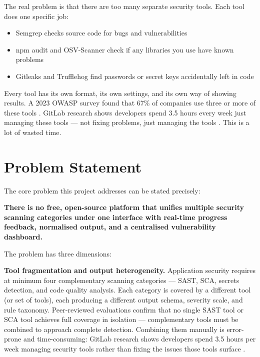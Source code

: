 \documentclass[12pt,a4paper]{report}
\begin{document}
The real problem is that there are too many separate security tools. Each tool does one specific job:
\begin{itemize}
    \item Semgrep checks source code for bugs and vulnerabilities
    \item npm audit and OSV-Scanner check if any libraries you use have known problems
    \item Gitleaks and Trufflehog find passwords or secret keys accidentally left in code
\end{itemize}

Every tool has its own format, its own settings, and its own way of showing results. A 2023 OWASP survey found that 67\% of companies use three or more of these tools \cite{owasp2023}. GitLab research shows developers spend 3.5 hours every week just managing these tools --- not fixing problems, just managing the tools \cite{gitlab2023}. This is a lot of wasted time.

\section{Problem Statement}
\label{sec:problem_statement}

The core problem this project addresses can be stated precisely:

\textbf{There is no free, open-source platform that unifies multiple security scanning categories under one interface with real-time progress feedback, normalised output, and a centralised vulnerability dashboard.}

The problem has three dimensions:

\textbf{Tool fragmentation and output heterogeneity.}
Application security requires at minimum four complementary scanning categories --- SAST, SCA, secrets detection, and code quality analysis. Each category is covered by a different tool (or set of tools), each producing a different output schema, severity scale, and rule taxonomy. Peer-reviewed evaluations confirm that no single SAST tool \cite{li2023} or SCA tool \cite{alfadel2023} achieves full coverage in isolation --- complementary tools must be combined to approach complete detection. Combining them manually is error-prone and time-consuming: GitLab research shows developers spend 3.5 hours per week managing security tools rather than fixing the issues those tools surface \cite{gitlab2023}.
\end{document}
